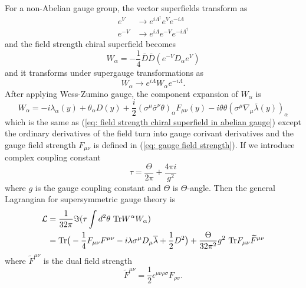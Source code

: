 \documentclass[12pt]{report}
\begin{document}
For a non-Abelian gauge group, the vector superfields transform as
\begin{align}
e^{V} &\to e^{i \Lambda^{\dag}} e^{V} e^{-i \Lambda}\\
e^{-V} & \to e^{i \Lambda} e^{-V} e^{-i \Lambda^{\dag}}
\end{align}
and the field strength chiral superfield becomes
\begin{equation}
W_{\alpha} = -\frac{1}{4} \overline{D} \overline{D} (e^{-V} D_{\alpha} e^{V})
\end{equation}
and it transforms under supergauge transformations as
\begin{equation}
W_{\alpha} \to e^{i \Lambda} W_{\alpha} e^{-i \Lambda}.
\end{equation}
After applying Wess-Zumino gauge, the component expansion of $W_{\alpha}$ is
\begin{equation}
W_{\alpha} = -i \lambda_{\alpha} (y) + \theta_{\alpha} D(y) + \frac{i}{2} (\sigma^{\mu} \overline{\sigma}^{\nu} \theta)_{\alpha} F_{\mu \nu} (y) - i \theta \theta (\sigma^{\mu} \nabla_{\mu} \overline{\lambda} (y))_{\alpha}
\end{equation}
which is the same as (\ref{eq: field strength chiral superfield in abelian gauge}) except the ordinary derivatives of the field turn into gauge corivant derivatives and the gauge field strength $F_{\mu \nu}$ is defined in (\ref{eq: gauge field strength}).
If we introduce complex coupling constant
\begin{equation}
\tau = \frac{\Theta}{2 \pi} + \frac{4 \pi i}{g^{2}}
\end{equation}
where $g$ is the gauge coupling constant and $\Theta$ is $\Theta$-angle.
Then the general Lagrangian for supersymmetric gauge theory is
\begin{align}
\mathcal{L} &= \frac{1}{32 \pi} \Im (\tau \int d^{2} \theta \ \mathrm{Tr} W^{\alpha} W_{\alpha}) \notag\\
&= \mathrm{Tr} \big( -\frac{1}{4} F_{\mu \nu} F^{\mu \nu} -i \lambda \sigma^{\mu} D_{\mu} \overline{\lambda} + \frac{1}{2} D^{2} \big)
+ \frac{\Theta}{32 \pi^{2}} g^{2} \ \mathrm{Tr} F_{\mu \nu} \widetilde{F}^{\mu \nu}
\end{align}
where $\widetilde{F}^{\mu \nu}$ is the dual field strength
\begin{equation}
\widetilde{F}^{\mu \nu} = \frac{1}{2} \epsilon^{\mu \nu \rho \sigma} F_{\rho \sigma} .
\end{equation}
\end{document}
